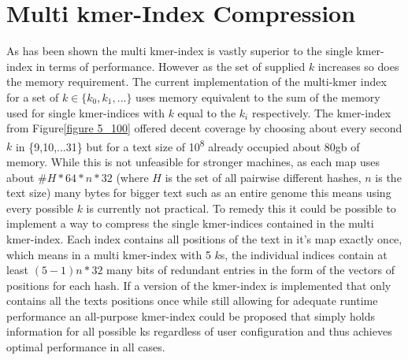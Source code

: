 \section{Multi kmer-Index Compression}
As has been shown the multi kmer-index is vastly superior to the single kmer-index in terms of performance.
However as the set of supplied $k$ increases so does the memory requirement. The current implementation of the
multi-kmer index for a set of $k\in\{k_{0}, k_{1}, ...\}$ uses memory equivalent to the sum of the memory used for
single kmer-indices with $k$ equal to the $k_{i}$ respectively.  The
kmer-index from Figure\ref{figure 5_100} offered decent coverage
by choosing about every second$k$ in \{9,10,...31\} but for a text
size of 10\textsuperscript{8} already occupied about 80gb of memory. While this is not unfeasible for stronger machines,
as each map uses about $\#H*64*n*32$ (where $H$ is the set of all pairwise different
hashes, $n$ is the text size) many bytes for bigger text such
as an entire genome this means using every possible $k$ is currently not
practical.  To remedy this it could be possible to implement a way
to compress the single kmer-indices contained in the multi kmer-index.
Each index contains all positions of the text in it's map exactly
once, which means in a multi kmer-index with 5 $k$s, the individual indices
contain at least $(5-1)n*32$ many bits of redundant entries in the
form of the vectors of positions for each hash. If a version of the
kmer-index is implemented that only contains all the texts positions
once while still allowing for adequate runtime performance an all-purpose
kmer-index could be proposed that simply holds information for all
possible ks regardless of user configuration and thus achieves optimal
performance in all cases.

